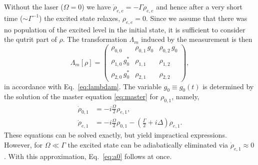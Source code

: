 \documentclass[12pt,
onecolumn,
superscriptaddress,
floatfix,
]{revtex4-2}
\begin{document}
Without the laser ($\Omega= 0$) we have $\dot \rho_{e,e}= -\Gamma \rho_{e,e}$ 
 and hence after a very short time ($\sim \Gamma^{-1}$) the excited state relaxes, 
 $\rho_{e,e}= 0$.
Since we assume that there was no population of the excited level in the 
 initial state, it is sufficient to consider the qutrit part of $\rho$.
The transformation $\Lambda_m$ induced by the measurement is then
%
\begin{equation}
 \Lambda_m[\rho]=
 \begin{pmatrix}
  \rho_{0,0}& \rho_{0,1}\,g_0&\rho_{0,2}\,g_0 \\
  \rho_{1,0}\,g_0^*& \rho_{1,1}&\rho_{1,2} \\
  \rho_{2,0}\,g_0^*& \rho_{2,1}&\rho_{2,2}
 \end{pmatrix},
\end{equation}
%
 in accordance with Eq.~\eqref{eq:lambdam}.
The variable $g_0\equiv g_0(t)$ is determined by the solution of the master 
 equation \eqref{eq:master} for $\rho_{0,1}$, namely,
%
\begin{align}
 \dot\rho_{0,1}&= -i\frac\Omega2 \rho_{e,1}, \\
 \dot\rho_{e,1}&= -i\frac\Omega2 \rho_{0,1}-
                 \left(\frac\Gamma2+i\Delta\right)\rho_{e,1}.
\end{align}
%
These equations can be solved exactly, but yield impractical expressions.
However, for $\Omega\ll \Gamma$ the excited state can be adiabatically 
 eliminated via $\dot{\rho}_{e,1}\approx 0$.
With this approximation, Eq.~\eqref{eq:a0} follows at once.
\end{document}
